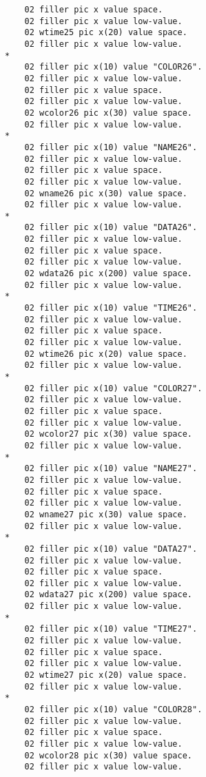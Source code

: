 {{{\begin{verbatim}
          02 filler pic x value space.
          02 filler pic x value low-value.
          02 wtime25 pic x(20) value space.
          02 filler pic x value low-value.
      *    
          02 filler pic x(10) value "COLOR26".
          02 filler pic x value low-value.
          02 filler pic x value space.
          02 filler pic x value low-value.
          02 wcolor26 pic x(30) value space.
          02 filler pic x value low-value.
      *    
          02 filler pic x(10) value "NAME26".
          02 filler pic x value low-value.
          02 filler pic x value space.
          02 filler pic x value low-value.
          02 wname26 pic x(30) value space.
          02 filler pic x value low-value.
      *    
          02 filler pic x(10) value "DATA26".
          02 filler pic x value low-value.
          02 filler pic x value space.
          02 filler pic x value low-value.
          02 wdata26 pic x(200) value space.
          02 filler pic x value low-value.
      *    
          02 filler pic x(10) value "TIME26".
          02 filler pic x value low-value.
          02 filler pic x value space.
          02 filler pic x value low-value.
          02 wtime26 pic x(20) value space.
          02 filler pic x value low-value.
      *    
          02 filler pic x(10) value "COLOR27".
          02 filler pic x value low-value.
          02 filler pic x value space.
          02 filler pic x value low-value.
          02 wcolor27 pic x(30) value space.
          02 filler pic x value low-value.
      *    
          02 filler pic x(10) value "NAME27".
          02 filler pic x value low-value.
          02 filler pic x value space.
          02 filler pic x value low-value.
          02 wname27 pic x(30) value space.
          02 filler pic x value low-value.
      *    
          02 filler pic x(10) value "DATA27".
          02 filler pic x value low-value.
          02 filler pic x value space.
          02 filler pic x value low-value.
          02 wdata27 pic x(200) value space.
          02 filler pic x value low-value.
      *    
          02 filler pic x(10) value "TIME27".
          02 filler pic x value low-value.
          02 filler pic x value space.
          02 filler pic x value low-value.
          02 wtime27 pic x(20) value space.
          02 filler pic x value low-value.
      *    
          02 filler pic x(10) value "COLOR28".
          02 filler pic x value low-value.
          02 filler pic x value space.
          02 filler pic x value low-value.
          02 wcolor28 pic x(30) value space.
          02 filler pic x value low-value.

\end{verbatim}}}}
